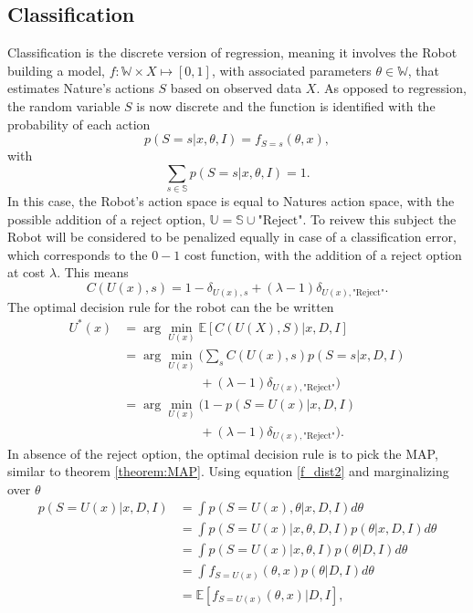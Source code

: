 \subsection{Classification}
\label{sec:baycl}
Classification is the discrete version of regression, meaning it involves the Robot building a model, $f: \mathbb{W}\times X\mapsto[0,1]$, with associated parameters $\theta\in \mathbb{W}$, that estimates Nature's actions $S$ based on observed data $X$. As opposed to regression, the random variable $S$ is now discrete and the function is identified with the probability of each action
\begin{equation}
	p(S = s|x,\theta,I)= f_{S = s}(\theta,x),
	\label{f_dist2}
\end{equation}
with
\begin{equation}
	\sum_{s\in\mathbb{S}} p(S = s|x,\theta,I) = 1.
\end{equation}
In this case, the Robot's action space is equal to Natures action space, with the possible addition of a reject option, $\mathbb{U}=\mathbb{S}\cup \text{"Reject"}$. To reivew this subject the Robot will be considered to be penalized equally in case of a classification error, which corresponds to the $0-1$ cost function, with the addition of a reject option at cost $\lambda$. This means
\begin{equation}
	C(U(x),s) = 1- \delta_{U(x),s}+(\lambda-1)\delta_{U(x),\text{"Reject"}}.
\end{equation}
The optimal decision rule for the robot can the be written
\begin{equation}
	\begin{split}
		U^*(x) & = \arg\min_{U(x)}\mathbb{E}[C(U(X), S)|x,D,I]\\
		&= \arg\min_{U(x)}\bigg(\sum_{s}C(U(x),s)p(S = s|x,D,I)\\
		&\qquad\qquad\qquad+(\lambda-1)\delta_{U(x),\text{"Reject"}}\bigg)\\
		& = \arg\min_{U(x)}\bigg(1- p(S=U(x)|x,D,I)\\
		&\qquad\qquad\qquad+(\lambda-1)\delta_{U(x),\text{"Reject"}}\bigg).
	\end{split}
	\label{eq:expected_cost1}
\end{equation}
In absence of the reject option, the optimal decision rule is to pick the MAP, similar to theorem \ref{theorem:MAP}. Using equation \eqref{f_dist2} and marginalizing over $\theta$
\begin{equation}
	\begin{split}
		p(S= U(x)|x,D,I) &= \int p(S = U(x),\theta|x,D,I) d\theta \\
		& = \int p(S = U(x)|x,\theta,D,I)  p(\theta|x,D,I)d\theta \\
		& = \int p(S = U(x)|x,\theta,I)  p(\theta|D,I)d\theta \\
		& = \int f_{S = U(x)}(\theta,x)  p(\theta|D,I)d\theta \\
		& = \mathbb{E}[f_{S = U(x)}(\theta,x)|D,I],\\
	\end{split}
	\label{eq:q5}
\end{equation}
